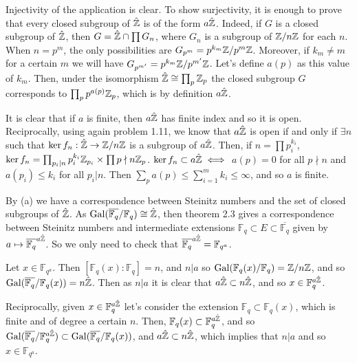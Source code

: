 \begin{sol}
	\item Injectivity of the application is clear. To show surjectivity, it is enough to prove that every closed subgroup of $\hat{\mathbb{Z}}$ is of the form $a\hat{\mathbb{Z}}$. Indeed, if $G$ is a closed subgroup of $\hat{\mathbb{Z}}$, then $G = \hat{\mathbb{Z}} \cap \prod{G_n}$, where $G_n$ is a subgroup of $\mathbb{Z}/n\mathbb{Z}$ for each $n$. When $n = p^m$, the only possibilities are $G_{p^m} = p^{k_m} \mathbb{Z}/p^m\mathbb{Z}$. Moreover, if $k_m \neq m$ for a certain $m$ we will have $G_{p^{m'}} = p^{k_m} \mathbb{Z} /p^{m'} \mathbb{Z}$. Let's define $a(p)$ as this value of $k_m$. Then, under the isomorphism $\hat{\mathbb{Z}} \cong \prod_p \mathbb{Z}_p$ the closed subgroup $G$ corresponds to $\prod_{p} p^{a(p)}\mathbb{Z}_p$, which is by definition $a \hat{\mathbb{Z}}$.

	It is clear that if $a$ is finite, then $a\hat{\mathbb{Z}}$ has finite index and so it is open. Reciprocally, using again problem 1.11, we know that $a\hat{\mathbb{Z}}$ is open if and only if $\exists n$ such that $\ker f_n: \hat{\mathbb{Z}} \to \mathbb{Z}/n\mathbb{Z}$ is a subgroup of $a\hat{\mathbb{Z}}$. Then, if $n = \prod p_i^{k_i}$, $\ker f_n = \prod_{p_i | n} p_i^{k_i} \mathbb{Z}_{p_i} \times \prod{p \nmid n} \mathbb{Z}_p$. $\ker f_n \subset a\hat{\mathbb{Z}} \iff$ $a(p) = 0$ for all $p \nmid n$ and $a(p_i) \leq k_i$ for all $p_i | n$. Then $\sum_p a(p) \leq \sum_{i = 1}^m k_i \leq \infty$, and so $a$ is finite.

	\item By (a) we have a correspondence between Steinitz numbers and the set of closed subgroups of $\hat{\mathbb{Z}}$. As $\mathrm{Gal}(\overline{\mathbb{F}_q}/ \mathbb{F}_q) \cong \hat{\mathbb{Z}}$, then theorem 2.3 gives a correspondence between Steinitz numbers and intermediate extensions $\mathbb{F}_q \subset E \subset \overline{\mathbb{F}_q}$ given by $a \mapsto \overline{\mathbb{F}_q}^{a\hat{\mathbb{Z}}}$. So we only need to check that $\overline{\mathbb{F}_q}^{a\hat{\mathbb{Z}}} = \mathbb{F}_{q^a}$.

	Let $x \in \mathbb{F}_{q^a}$. Then $[\mathbb{F}_q (x) : \mathbb{F}_q] = n$, and $n|a$ so $\mathrm{Gal}(\mathbb{F}_q(x)/\mathbb{F}_q) = \mathbb{Z}/n\mathbb{Z}$, and so $\mathrm{Gal}(\overline{\mathbb{F}_q}/\mathbb{F}_q(x)) = n \hat{\mathbb{Z}}$. Then as $n|a$ it is clear that $a \hat{\mathbb{Z}} \subset n\hat{\mathbb{Z}}$, and so $x \in \mathbb{F}_{q}^{a\hat{\mathbb{Z}}}$.

	Reciprocally, given $x \in \mathbb{F}_{q}^{a\hat{\mathbb{Z}}}$ let's consider the extension $\mathbb{F}_q \subset \mathbb{F}_q(x)$, which is finite and of degree a certain $n$. Then, $\mathbb{F}_q(x) \subset \mathbb{F}_q^{a\hat{\mathbb{Z}}}$, and so $\mathrm{Gal}(\overline{\mathbb{F}_q}/\mathbb{F}_q^{a\hat{\mathbb{Z}}}) \subset \mathrm{Gal}(\overline{\mathbb{F}_q}/\mathbb{F}_q(x))$, and $a\hat{\mathbb{Z}} \subset n\hat{\mathbb{Z}}$, which implies that $n | a$ and so $x \in \mathbb{F}_{q^a}$.
\end{sol}


